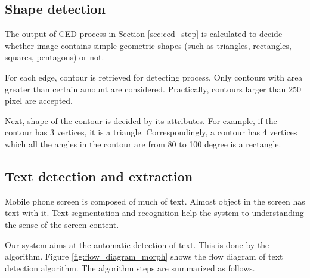 \subsection{Shape detection}
The output of CED process in Section \ref{sec:ced_step} is calculated to decide whether image contains simple geometric shapes (such as triangles, rectangles, squares, pentagons) or not.

For each edge, contour is retrieved for detecting process. Only contours with area greater than certain amount are considered. Practically, contours larger than 250 pixel are accepted.

Next, shape of the contour is decided by its attributes. For example, if the contour has 3 vertices, it is a triangle. Correspondingly, a contour has 4 vertices which all the angles in the contour are from 80 to 100 degree is a rectangle.

\subsection{Text detection and extraction}
Mobile phone screen is composed of much of text. Almost object in the screen has text with it. Text segmentation and recognition help the system to understanding the sense of the screen content.

Our system aims at the automatic detection of text. This is done by the algorithm. Figure \ref{fig:flow_diagram_morph} shows the flow diagram of text detection algorithm. The algorithm steps are summarized as follows.

